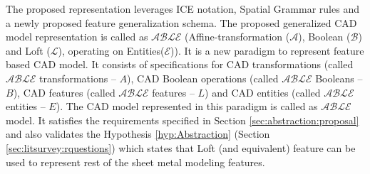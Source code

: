 The proposed representation leverages ICE notation, Spatial Grammar rules and a newly proposed feature generalization schema. 
The proposed generalized CAD model representation is called as {\bf $\mathcal{ABLE}$} (Affine-transformation ($\mathcal{A}$),  Boolean ($\mathcal{B}$) and Loft ($\mathcal{L}$), operating on Entities($\mathcal{E}$)).  It is a new paradigm to represent feature based CAD model. It consists of specifications for CAD transformations (called $\mathcal{ABLE}$  transformations -- $A$), CAD Boolean operations (called $\mathcal{ABLE}$ Booleans -- $B$), CAD features (called $\mathcal{ABLE}$ features -- $L$) and CAD entities (called $\mathcal{ABLE}$ entities -- $E$). The CAD model represented in this paradigm is called as $\mathcal{ABLE}$ model. It satisfies the requirements specified in Section \ref{sec:abstraction:proposal}  and also validates the Hypothesis \ref{hyp:Abstraction} (Section \ref{sec:litsurvey:rquestions}) which states that Loft (and equivalent) feature can be used to represent rest of the sheet metal modeling features. 


